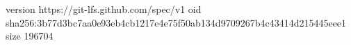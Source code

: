 version https://git-lfs.github.com/spec/v1
oid sha256:3b77d3bc7aa0e93eb4cb1217e4e75f50ab134d9709267b4c43414d215445eee1
size 196704
